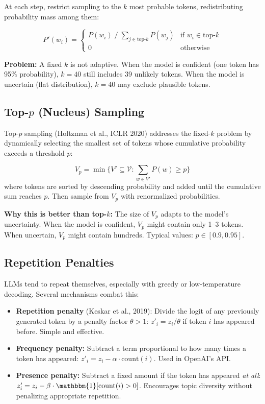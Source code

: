 At each step, restrict sampling to the $k$ most probable tokens, redistributing
probability mass among them:

\[
    P'(w_i) = \begin{cases}
        P(w_i) \;/\; \sum_{j \in \text{top-}k} P(w_j) & \text{if } w_i \in \text{top-}k \\[4pt]
        0 & \text{otherwise}
    \end{cases}
\]

\textbf{Problem:}  A fixed $k$ is not adaptive.  When the model is confident
(one token has 95\% probability), $k{=}40$ still includes 39 unlikely tokens.
When the model is uncertain (flat distribution), $k{=}40$ may exclude plausible
tokens.

\subsection{Top-$p$ (Nucleus) Sampling}

Top-$p$ sampling (Holtzman et al., ICLR 2020) addresses the fixed-$k$ problem by
dynamically selecting the smallest set of tokens whose cumulative probability
exceeds a threshold $p$:

\[
    V_p = \min \{V' \subseteq \mathcal{V} : \sum_{w \in V'} P(w) \geq p\}
\]
where tokens are sorted by descending probability and added until the cumulative
sum reaches $p$.  Then sample from $V_p$ with renormalized probabilities.

\textbf{Why this is better than top-$k$:}  The size of $V_p$ adapts to the
model's uncertainty.  When the model is confident, $V_p$ might contain only
1--3 tokens.  When uncertain, $V_p$ might contain hundreds.  Typical values:
$p \in [0.9, 0.95]$.

\subsection{Repetition Penalties}

LLMs tend to repeat themselves, especially with greedy or low-temperature
decoding.  Several mechanisms combat this:

\begin{itemize}
    \item \textbf{Repetition penalty} (Keskar et al., 2019): Divide the logit
          of any previously generated token by a penalty factor $\theta > 1$:
          $z'_i = z_i / \theta$ if token $i$ has appeared before.  Simple and
          effective.
    \item \textbf{Frequency penalty:} Subtract a term proportional to how many
          times a token has appeared: $z'_i = z_i - \alpha \cdot \text{count}(i)$.
          Used in OpenAI's API.
    \item \textbf{Presence penalty:} Subtract a fixed amount if the token has
          appeared \emph{at all}: $z'_i = z_i - \beta \cdot \mathbbm{1}[\text{count}(i) > 0]$.
          Encourages topic diversity without penalizing appropriate repetition.
\end{itemize}

